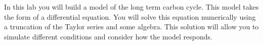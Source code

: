 In this lab you will build a model of the long term carbon cycle. This model takes the form of a differential equation. You will solve this equation numerically using a truncation of the Taylor series and some algebra. This solution will allow you to simulate different conditions and consider how the model responds.